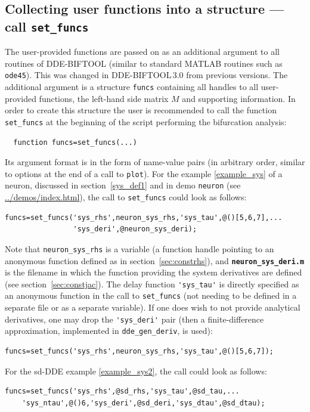 \documentclass[10pt]{scrartcl}
\newcommand{\DDEBIFCODE}{\textsc{DDE-BIFTOOL}}
\newcommand{\file}[1]{\textbf{\texttt{#1}}}
\newcommand{\demobase}{\url{../demos/index.html}}
\newcommand{\blist}[1]{\mbox{\lstinline!#1!}}
\begin{document}
\subsection{Collecting user functions into a structure --- call
  \texorpdfstring{\blist{set_funcs}}{set\_funcs}}
\label{sec:funcs}
The user-provided functions are passed on as an additional argument to
all routines of \DDEBIFCODE{} (similar to standard MATLAB routines
such as \blist{ode45}). This was changed in \DDEBIFCODE{}\,3.0 from
previous versions. The additional argument is a structure
\blist{funcs} containing all handles to all user-provided functions,
the left-hand side matrix $M$ and supporting information. In order to
create this structure the user is recommended to call the function
\blist{set_funcs} at the beginning of the script performing the
bifurcation analysis:
\begin{lstlisting}
  function funcs=set_funcs(...)
\end{lstlisting}
Its argument format is in the form of name-value pairs (in arbitrary
order, similar to options at the end of a call to \blist{plot}). For
the example \eqref{example_sys} of a neuron, discussed in
section~\ref{sys_def1} and in demo \texttt{neuron} (see
\demobase{}), the call to \blist{set_funcs} could look as
follows:
\begin{lstlisting}
funcs=set_funcs('sys_rhs',neuron_sys_rhs,'sys_tau',@()[5,6,7],...
                'sys_deri',@neuron_sys_deri);
\end{lstlisting}
Note that \blist{neuron_sys_rhs} is a variable (a function handle
pointing to an anonymous function defined as in
section~\ref{sec:constrhs}), and \file{neuron\_sys\_deri.m} is the
filename in which the function providing the system derivatives are
defined (see section~\ref{sec:constjac}). The delay function
\blist{'sys_tau'} is directly specified as an anonymous function in
the call to \blist{set_funcs} (not needing to be defined in a separate
file or as a separate variable). If one does wish to not provide
analytical derivatives, one may drop the \blist{'sys_deri'} pair (then
a finite-difference approximation, implemented in \blist{dde_gen_deriv}, is
used):
\begin{lstlisting}
funcs=set_funcs('sys_rhs',neuron_sys_rhs,'sys_tau',@()[5,6,7]);
\end{lstlisting}
For the sd-DDE example \eqref{example_sys2}, the call could look as follows:
\begin{lstlisting}
funcs=set_funcs('sys_rhs',@sd_rhs,'sys_tau',@sd_tau,...
    'sys_ntau',@()6,'sys_deri',@sd_deri,'sys_dtau',@sd_dtau);  
\end{lstlisting}
\end{document}

